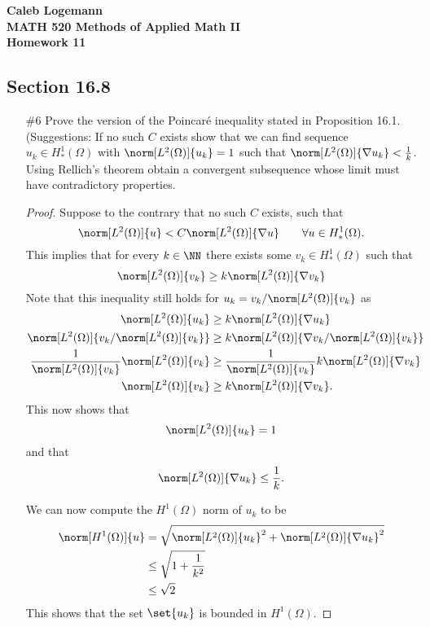 \documentclass[11pt, oneside]{article}
\begin{document}
\noindent \textbf{\Large{Caleb Logemann \\
MATH 520 Methods of Applied Math II \\
Homework 11
}}

\subsection*{Section 16.8}
\begin{enumerate}
  \item[\#6]
    Prove the version of the Poincar\'e inequality stated in Proposition 16.1.
    (Suggestions: If no such $C$ exists show that we can find sequence
    $u_k \in H^1_*(\Omega)$ with $\norm[L^2(\Omega)]{u_k} = 1$ such that
    $\norm[L^2(\Omega)]{\nabla u_k} < \frac{1}{k}$.
    Using Rellich's theorem obtain a convergent subsequence whose limit must
    have contradictory properties.

    \begin{proof}
      Suppose to the contrary that no such $C$ exists, such that
      \[
        \norm[L^2(\Omega)]{u} < C \norm[L^2(\Omega)]{\nabla u} \qquad \forall u \in H^1_*(\Omega).
      \]
      This implies that for every $k \in \NN$ there exists some
      $v_k \in H^1_*(\Omega)$ such that
      \[
        \norm[L^2(\Omega)]{v_k} \ge k \norm[L^2(\Omega)]{\nabla v_k}
      \]
      Note that this inequality still holds for
      $u_k = v_k/\norm[L^2(\Omega)]{v_k}$ as
      \begin{align*}
        \norm[L^2(\Omega)]{u_k} &\ge k \norm[L^2(\Omega)]{\nabla u_k} \\
        \norm[L^2(\Omega)]{v_k/\norm[L^2(\Omega)]{v_k}} &\ge k \norm[L^2(\Omega)]{\nabla v_k/\norm[L^2(\Omega)]{v_k}} \\
        \frac{1}{\norm[L^2(\Omega)]{v_k}} \norm[L^2(\Omega)]{v_k} &\ge \frac{1}{\norm[L^2(\Omega)]{v_k}} k \norm[L^2(\Omega)]{\nabla v_k} \\
        \norm[L^2(\Omega)]{v_k} &\ge k \norm[L^2(\Omega)]{\nabla v_k}.
      \end{align*}
      This now shows that
      \[
        \norm[L^2(\Omega)]{u_k} = 1
      \]
      and that
      \[
        \norm[L^2(\Omega)]{\nabla u_k} \le \frac{1}{k}.
      \]

      We can now compute the $H^1(\Omega)$ norm of $u_k$ to be
      \begin{align*}
        \norm[H^1(\Omega)]{u} &= \sqrt{\norm[L^2(\Omega)]{u_k}^2 + \norm[L^2(\Omega)]{\nabla u_k}^2} \\
        &\le \sqrt{1 + \frac{1}{k^2}} \\
        &\le \sqrt{2}
      \end{align*}
      This shows that the set $\set{u_k}$ is bounded in $H^1(\Omega)$.


\end{proof}
\end{enumerate}
\end{document}
